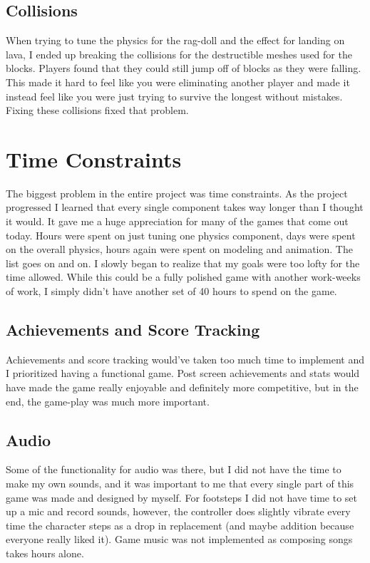 \documentclass[conference,compsoc]{IEEEtran}
\begin{document}
\subsection{Collisions}

When trying to tune the physics for the rag-doll and the effect for landing on lava, I ended up breaking the collisions for the destructible meshes used for the blocks. Players found that they could still jump off of blocks as they were falling. This made it hard to feel like you were eliminating another player and made it instead feel like you were just trying to survive the longest without mistakes. Fixing these collisions fixed that problem.

\section{Time Constraints}

The biggest problem in the entire project was time constraints. As the project progressed I learned that every single component takes way longer than I thought it would. It gave me a huge appreciation for many of the games that come out today. Hours were spent on just tuning one physics component, days were spent on the overall physics, hours again were spent on modeling and animation. The list goes on and on. I slowly began to realize that my goals were too lofty for the time allowed. While this could be a fully polished game with another work-weeks of work, I simply didn't have another set of 40 hours to spend on the game.

\subsection{Achievements and Score Tracking}

Achievements and score tracking would've taken too much time to implement and I prioritized having a functional game. Post screen achievements and stats would have made the game really enjoyable and definitely more competitive, but in the end, the game-play was much more important.

\subsection{Audio}

Some of the functionality for audio was there, but I did not have the time to make my own sounds, and it was important to me that every single part of this game was made and designed by myself. For footsteps I did not have time to set up a mic and record sounds, however, the controller does slightly vibrate every time the character steps as a drop in replacement (and maybe addition because everyone really liked it).
Game music was not implemented as composing songs takes hours alone.
\end{document}
